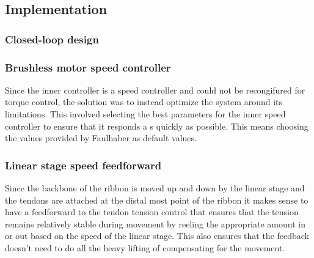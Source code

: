 \subsection{Implementation}


\subsubsection{Closed-loop design}



\subsubsection{Brushless motor speed controller}
Since the inner controller is a speed controller and could not be recongifured for torque control, the solution was to instead optimize the system around its limitations. This involved selecting the best parameters for the inner speed controller to ensure that it responds a s quickly as possible. This means choosing the values provided by Faulhaber as default values. 

\subsubsection{Linear stage speed feedforward}
Since the backbone of the ribbon is moved up and down by the linear stage and the tendons are attached at the distal most point of the ribbon it makes sense to have a feedforward to the tendon tension control that ensures that the tension remains relatively stable during movement by reeling the appropriate amount in or out based on the speed of the linear stage. This also ensures that the feedback doesn't need to do all the heavy lifting of compensating for the movement.

